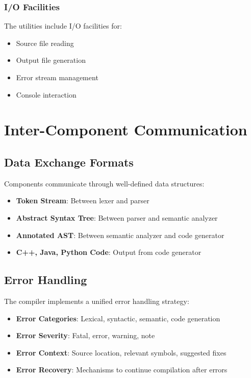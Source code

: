 \documentclass[12pt,a4paper]{article}
\begin{document}
\subsubsection{I/O Facilities}

The utilities include I/O facilities for:

\begin{itemize}
    \item Source file reading
    \item Output file generation
    \item Error stream management
    \item Console interaction
\end{itemize}

\section{Inter-Component Communication}

\subsection{Data Exchange Formats}

Components communicate through well-defined data structures:

\begin{itemize}
    \item \textbf{Token Stream}: Between lexer and parser
    \item \textbf{Abstract Syntax Tree}: Between parser and semantic analyzer
    \item \textbf{Annotated AST}: Between semantic analyzer and code generator
    \item \textbf{C++, Java, Python Code}: Output from code generator
\end{itemize}

\subsection{Error Handling}

The compiler implements a unified error handling strategy:

\begin{itemize}
    \item \textbf{Error Categories}: Lexical, syntactic, semantic, code generation
    \item \textbf{Error Severity}: Fatal, error, warning, note
    \item \textbf{Error Context}: Source location, relevant symbols, suggested fixes
    \item \textbf{Error Recovery}: Mechanisms to continue compilation after errors
\end{itemize}
\end{document}

